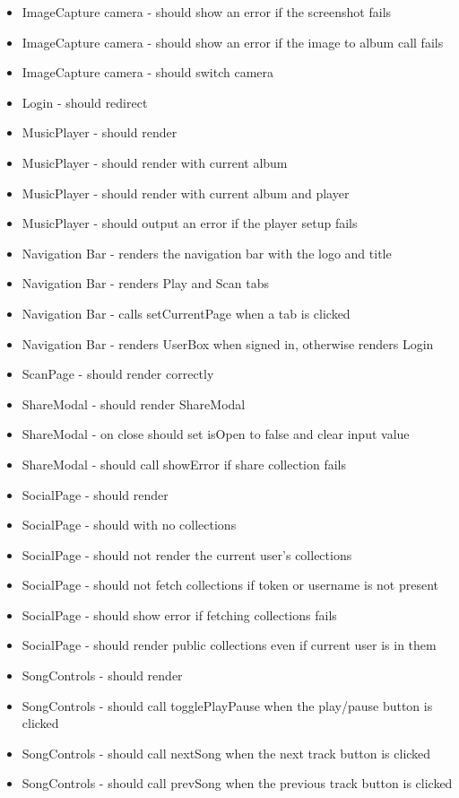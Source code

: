 \begin{multicols}{1}
\begin{itemize}
\item ImageCapture camera - should show an error if the screenshot fails
\item ImageCapture camera - should show an error if the image to album call fails
\item ImageCapture camera - should switch camera
\item Login - should redirect
\item MusicPlayer - should render
\item MusicPlayer - should render with current album
\item MusicPlayer - should render with current album and player
\item MusicPlayer - should output an error if the player setup fails
\item Navigation Bar - renders the navigation bar with the logo and title
\item Navigation Bar - renders Play and Scan tabs
\item Navigation Bar - calls setCurrentPage when a tab is clicked
\item Navigation Bar - renders UserBox when signed in, otherwise renders Login
\item ScanPage - should render correctly
\item ShareModal - should render ShareModal
\item ShareModal - on close should set isOpen to false and clear input value
\item ShareModal - should call showError if share collection fails
\item SocialPage - should render
\item SocialPage - should with no collections
\item SocialPage - should not render the current user's collections
\item SocialPage - should not fetch collections if token or username is not present
\item SocialPage - should show error if fetching collections fails
\item SocialPage - should render public collections even if current user is in them
\item SongControls - should render
\item SongControls - should call togglePlayPause when the play/pause button is clicked
\item SongControls - should call nextSong when the next track button is clicked
\item SongControls - should call prevSong when the previous track button is clicked

\end{itemize}
\end{multicols}
